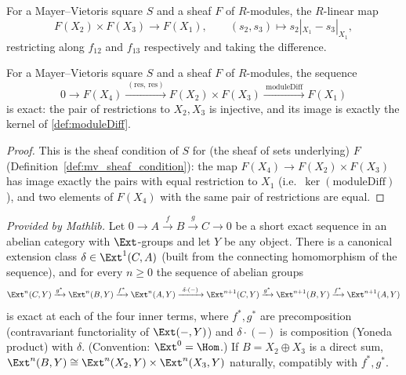 \begin{definition}
  \label{def:moduleDiff}
  \leanok
  For a Mayer--Vietoris square \(S\) and a sheaf \(F\) of \(R\)-modules, the \(R\)-linear map
  \[
    F(X_2) \times F(X_3) \longrightarrow F(X_1), \qquad
    (s_2, s_3) \longmapsto s_2|_{X_1} - s_3|_{X_1},
  \]
  restricting along \(f_{12}\) and \(f_{13}\) respectively and taking the difference.
\end{definition}

\begin{lemma}
  \label{lem:mv_exact_degree0}
  \leanok
  For a Mayer--Vietoris square \(S\) and a sheaf \(F\) of \(R\)-modules, the sequence
  \[
    0 \to F(X_4) \xrightarrow{\ (\mathrm{res},\,\mathrm{res})\ } F(X_2) \times F(X_3)
      \xrightarrow{\ \mathrm{moduleDiff}\ } F(X_1)
  \]
  is exact: the pair of restrictions to \(X_2, X_3\) is injective, and its image is exactly
  the kernel of \ref{def:moduleDiff}.
\end{lemma}
\begin{proof}
  \leanok
  This is the sheaf condition of \(S\) for (the sheaf of sets underlying) \(F\)
  (Definition~\ref{def:mv_sheaf_condition}): the map \(F(X_4) \to F(X_2) \times F(X_3)\) has
  image exactly the pairs with equal restriction to \(X_1\) (i.e.\
  \(\ker(\mathrm{moduleDiff})\)), and two elements of \(F(X_4)\) with the same pair of
  restrictions are equal.
\end{proof}

\begin{lemma}
  \label{lem:ext_contravariant_les}
  \mathlibok
  \textit{Provided by Mathlib.}
  Let \(0 \to A \xrightarrow{f} B \xrightarrow{g} C \to 0\) be a short exact sequence in an
  abelian category with \(\Ext\)-groups and let \(Y\) be any object. There is a canonical
  extension class \(\delta \in \Ext^1(C, A)\) (built from the connecting homomorphism of the
  sequence), and for every \(n \ge 0\) the sequence of abelian groups
  \[
    \Ext^n(C,Y) \xrightarrow{g^*} \Ext^n(B,Y) \xrightarrow{f^*} \Ext^n(A,Y)
      \xrightarrow{\ \delta \cdot (-)\ } \Ext^{n+1}(C,Y) \xrightarrow{g^*} \Ext^{n+1}(B,Y)
      \xrightarrow{f^*} \Ext^{n+1}(A,Y)
  \]
  is exact at each of the four inner terms, where \(f^*, g^*\) are precomposition
  (contravariant functoriality of \(\Ext(-,Y)\)) and \(\delta \cdot (-)\) is composition
  (Yoneda product) with \(\delta\). (Convention: \(\Ext^0 = \Hom\).) If \(B = X_2 \oplus X_3\)
  is a direct sum, \(\Ext^n(B,Y) \cong \Ext^n(X_2,Y) \times \Ext^n(X_3,Y)\) naturally,
  compatibly with \(f^*, g^*\).
\end{lemma}

